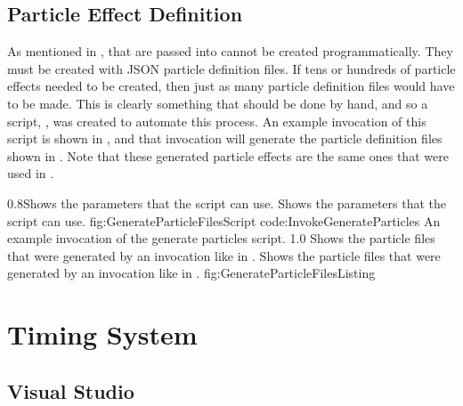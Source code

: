 \subsection{Particle Effect Definition}\label{ssec:instr_metrics_pe_definition}

As mentioned in ,  that are passed into  cannot be created programmatically. They must be created with JSON particle definition files. If tens or hundreds of particle effects needed to be created, then just as many particle definition files would have to be made. This is clearly something that should be done by hand, and so a script, , was created to automate this process. An example invocation of this script is shown in , and that invocation will generate the particle definition files shown in . Note that these generated particle effects are the same ones that were used in .

{0.8}{Shows the parameters that the  script can use.}
{Shows the parameters that the  script can use.}
{fig:GenerateParticleFilesScript}
\vspace{-1.0cm}
{code:InvokeGenerateParticles}
{An example invocation of the generate particles script.}
\vspace{-1.0cm}
{1.0}
{Shows the particle files that were generated by an invocation like in .}
{Shows the particle files that were generated by an invocation like in .}
{fig:GenerateParticleFilesListing}


\section{Timing System}\label{sec:instr_timing_system}

\subsection{Visual Studio}\label{ssec:instr_timing_system_vs}

